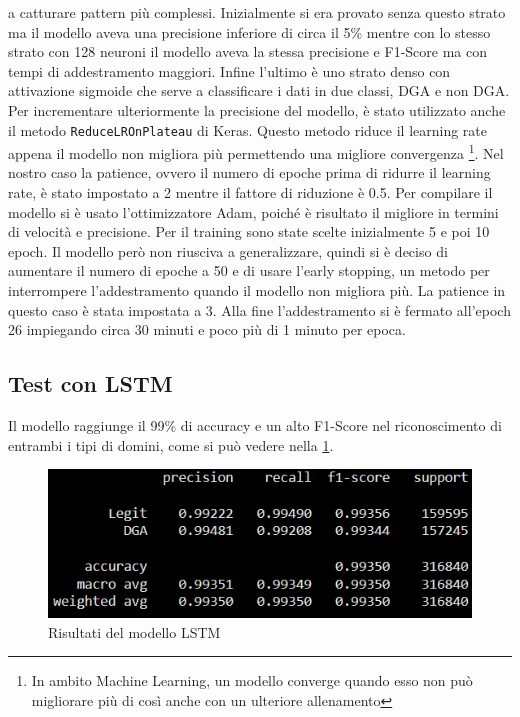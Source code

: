 \documentclass[12pt,a4paper,openright,twoside]{book}
\begin{document}
a catturare pattern più complessi. Inizialmente
si era provato senza questo strato ma 
il modello aveva una precisione inferiore di circa il 5\% mentre con lo stesso
strato con 128 neuroni il modello aveva la stessa precisione e F1-Score ma con tempi
di addestramento maggiori. Infine
l'ultimo è uno strato denso con attivazione sigmoide
che serve a classificare i dati in due classi, DGA e non DGA.
Per incrementare ulteriormente la precisione del modello,
è stato utilizzato anche il metodo \texttt{ReduceLROnPlateau} di Keras.
Questo metodo riduce il learning rate appena il modello non migliora più
permettendo una migliore convergenza \footnote{In ambito Machine Learning, un modello converge quando esso non può migliorare più di così anche con un ulteriore allenamento\cite{convergence}}. Nel nostro caso
la patience, ovvero il numero di epoche prima di ridurre il learning rate,
è stato impostato a 2 mentre il fattore di riduzione è 0.5.
Per compilare il modello si è usato l'ottimizzatore Adam,
poiché è risultato il migliore in termini di velocità e precisione.
Per il training sono state scelte inizialmente 5 e poi 10 epoch.
Il modello però non riusciva a generalizzare, quindi si è deciso di aumentare
il numero di epoche a 50 e di usare l'early stopping, un metodo per interrompere
l'addestramento quando il modello non migliora più. La patience in questo
caso è stata impostata a 3. Alla
fine l'addestramento si è fermato all'epoch 26 impiegando circa 30 minuti e poco più di 1 minuto per epoca.

\subsection{Test con LSTM}
Il modello raggiunge il 99\% di accuracy e un alto F1-Score nel riconoscimento di entrambi i tipi di domini,
come si può vedere nella \cref{fig:LSTM results}.

\begin{figure}[h]
    \centering
    \includegraphics[width=.8\linewidth]{figures/LSTM_results.png}
    \caption{Risultati del modello LSTM}
    \label{fig:LSTM results}
\end{figure}
\end{document}
